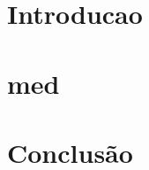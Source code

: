 \documentclass{configs/idp-model}
\begin{document}
\capaprincipal


\section{Introducao}


\section{med}

\section{Conclusão}
\end{document}
